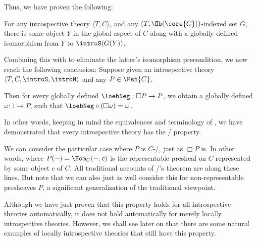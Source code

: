 Thus, we have proven the following:
\begin{theorem}\label{IntrospTyConFixedPoints}
For any introspective theory $\langle T, C \rangle$, and any  $(T, \Ob(\core{C}))$-indexed set $G$, there is some object $Y$ in the global aspect of $C$ along with a globally defined isomorphism from $Y$ to $\introS(G(Y))$.
\end{theorem}

Combining this with  to eliminate the latter's isomorphism precondition, we now reach the following conclusion:
\label{IntrospLoeb}
Suppose given an introspective theory $\langle T, C, \introS, \introN \rangle$ and any $P \in \Psh{C}$.

Then for every globally defined $\loebNeg : \Box P \to P$, we obtain a globally defined $\omega : 1 \to P$, such that $\loebNeg \circ (\Box \omega) = \omega$.

In other words, keeping in mind the equivalences and terminology of , we have demonstrated that every introspective theory has the \Loeb/ property.

We can consider the particular case where $P$ is $C$-\repsmall/, just as $\Box P$ is. In other words, where $P(-) = \Hom_C(-, c)$ is the representable presheaf on $C$ represented by some object $c$ of $C$. All traditional accounts of \Loeb/'s theorem are along these lines. But note that we can also just as well consider this  for non-representable presheaves $P$, a significant generalization of the traditional viewpoint.

Although we have just proven that this property holds for all introspective theories automatically, it does not hold automatically for merely locally introspective theories.  However, we shall see later on that there are some natural examples of locally introspective theories that still have this property. 

